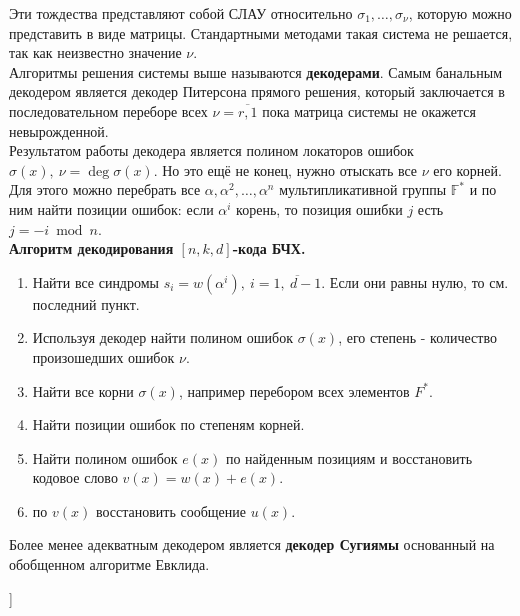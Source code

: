 Эти тождества представляют собой СЛАУ относительно $\sigma_1,\ldots,\sigma_\nu$,
которую можно представить в виде матрицы. Стандартными методами такая система не
решается, так как неизвестно значение $\nu$.\\

Алгоритмы решения системы выше называются \textbf{декодерами}. Самым банальным
декодером является декодер Питерсона прямого решения, который заключается в
последовательном переборе всех $\nu = \overline{r,1}$ пока матрица системы не
окажется невырожденной.\\

Результатом работы декодера является полином локаторов ошибок
$\sigma(x),~\nu = \deg \sigma(x)$. Но это ещё не конец, нужно отыскать все $\nu$
его корней. Для этого можно перебрать все $\alpha,\alpha^2,\ldots,\alpha^n$
мультипликативной группы $\mathbb{F}^*$ и по ним найти позиции ошибок: если $\alpha^i$
корень, то позиция ошибки $j$ есть $j = -i \bmod n$.\\

\textbf{Алгоритм декодирования $[n,k,d]$-кода БЧХ.}\\
\begin{enumerate}
  \item Найти все синдромы $s_i = w(\alpha^i),~i=\overline{1,~d-1}$. Если они
    равны нулю, то см. последний пункт.
  \item Используя декодер найти полином ошибок $\sigma(x)$, его степень -
    количество произошедших ошибок $\nu$.

  \item Найти все корни $\sigma(x)$, например перебором всех элементов $F^*$.

  \item Найти позиции ошибок по степеням корней.
  \item Найти полином ошибок $e(x)$ по найденным позициям и восстановить кодовое
    слово $v(x) = w(x) + e(x)$.
  \item по $v(x)$ восстановить сообщение $u(x)$.
\end{enumerate}

Более менее адекватным декодером является \textbf{декодер Сугиямы} основанный на
обобщенном алгоритме Евклида.


\bigbreak
[\cite[page 112-131]{gurov_23}]
